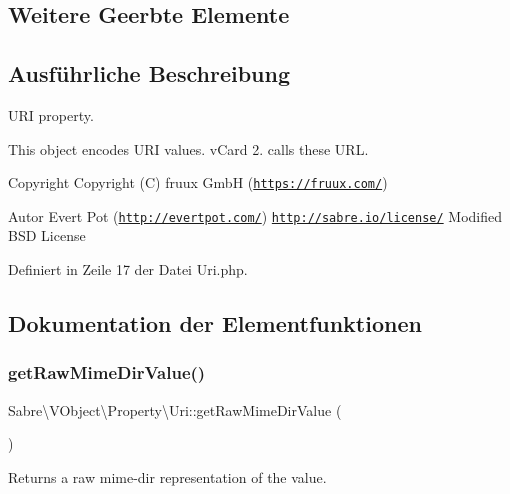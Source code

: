 \subsection*{Weitere Geerbte Elemente}


\subsection{Ausführliche Beschreibung}
U\+RI property.

This object encodes U\+RI values. v\+Card 2. calls these U\+RL.

\begin{DoxyCopyright}{Copyright}
Copyright (C) fruux GmbH (\href{https://fruux.com/}{\tt https\+://fruux.\+com/}) 
\end{DoxyCopyright}
\begin{DoxyAuthor}{Autor}
Evert Pot (\href{http://evertpot.com/}{\tt http\+://evertpot.\+com/})  \href{http://sabre.io/license/}{\tt http\+://sabre.\+io/license/} Modified B\+SD License 
\end{DoxyAuthor}


Definiert in Zeile 17 der Datei Uri.\+php.



\subsection{Dokumentation der Elementfunktionen}
\mbox{\label{class_sabre_1_1_v_object_1_1_property_1_1_uri_ab0b28f212e1e4d937223ff731afecdca}} 
\subsubsection{\texorpdfstring{get\+Raw\+Mime\+Dir\+Value()}{getRawMimeDirValue()}}
{\footnotesize\ttfamily Sabre\textbackslash{}\+V\+Object\textbackslash{}\+Property\textbackslash{}\+Uri\+::get\+Raw\+Mime\+Dir\+Value (\begin{DoxyParamCaption}{ }\end{DoxyParamCaption})}

Returns a raw mime-\/dir representation of the value.


